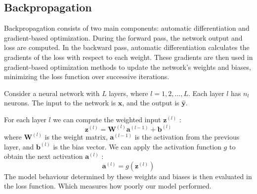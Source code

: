 

\subsection{Backpropagation}
Backpropagation consists of two main components: automatic differentiation and gradient-based optimization. During the forward pass, the network output and loss are computed. In the backward pass, automatic differentiation calculates the gradients of the loss with respect to each weight. These gradients are then used in gradient-based optimization methods to update the network's weights and biases, minimizing the loss function over successive iterations.

Consider a neural network with $L$ layers, where $l=1,2, \ldots, L$. Each layer $l$ has $n_l$ neurons. The input to the network is $\mathbf{x}$, and the output is $\hat{\mathbf{y}}$.

For each layer $l$ we can compute the weighted input $\mathbf{z}^{(l)}$ :
$$
\mathbf{z}^{(l)}=\mathbf{W}^{(l)} \mathbf{a}^{(l-1)}+\mathbf{b}^{(l)}
$$
where $\mathbf{W}^{(l)}$ is the weight matrix, $\mathbf{a}^{(l-1)}$ is the activation from the previous layer, and $\mathbf{b}^{(l)}$ is the bias vector. We can apply the activation function $g$ to obtain the next activation $\mathbf{a}^{(l)}$ :
$$
\mathbf{a}^{(l)}=g\left(\mathbf{z}^{(l)}\right)
$$
The model behaviour determined by these weights and biases is then evaluated in the loss function. Which measures how poorly our model performed.

